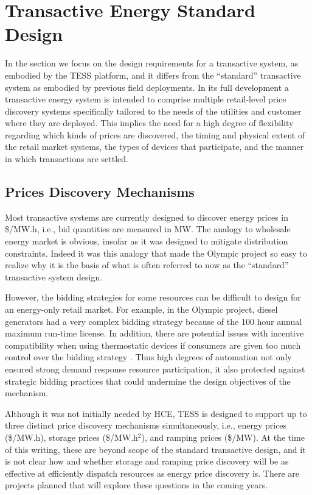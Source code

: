\section{Transactive Energy Standard Design}\label{sec:standard_design}

In the section we focus on the design requirements for a transactive system, as embodied by the TESS platform, and it differs from the ``standard'' transactive system as embodied by previous field deployments. In its full development a transactive energy system is intended to comprise multiple retail-level price discovery systems specifically tailored to the needs of the utilities and customer where they are deployed.  This implies the need for a high degree of flexibility regarding which kinds of prices are discovered, the timing and physical extent of the retail market systems, the types of devices that participate, and the manner in which transactions are settled.

\subsection{Prices Discovery Mechanisms}

Most transactive systems are currently designed to discover energy prices in \$/MW.h, i.e., bid quantities are measured in MW.  The analogy to wholesale energy market is obvious, insofar as it was designed to mitigate distribution constraints. Indeed it was this analogy that made the Olympic project \cite{hammerstrom_2008} so easy to realize why it is the basis of what is often referred to now as the ``standard'' transactive system design.

However, the bidding strategies for some resources can be difficult to design for an energy-only retail market.  For example, in the Olympic project, diesel generators had a very complex bidding strategy because of the 100 hour annual maximum run-time license.  In addition, there are potential issues with incentive compatibility when using thermostatic devices if consumers are given too much control over the bidding strategy \cite{Somani???}. Thus high degrees of automation not only ensured strong demand response resource participation, it also protected against strategic bidding practices that could undermine the design objectives of the mechanism.

Although it was not initially needed by HCE, TESS is designed to support up to three distinct price discovery mechanisms simultaneously, i.e., energy prices (\$/MW.h), storage prices (\$/MW.h$^2$), and ramping prices (\$/MW). At the time of this writing, these are beyond scope of the standard transactive design, and it is not clear how and whether storage and ramping price discovery will be as effective at efficiently dispatch resources as energy price discovery is. There are projects planned that will explore these questions in the coming years.

